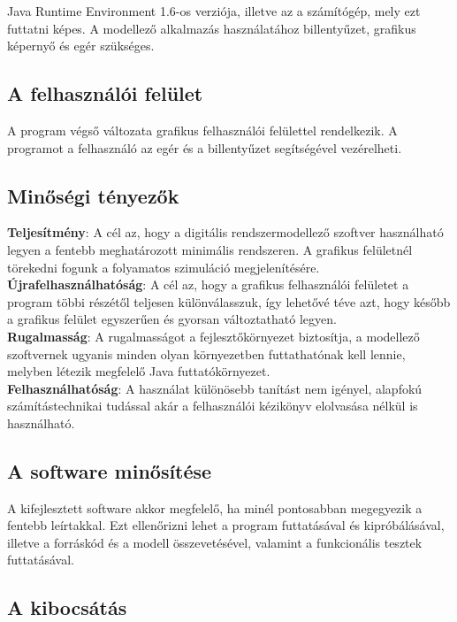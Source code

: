 Java Runtime Environment 1.6-os verziója, illetve az a számítógép, mely ezt futtatni képes. A modellező alkalmazás használatához billentyűzet, grafikus képernyő és egér szükséges.

\subsection{A felhasználói felület}

A program végső változata grafikus felhasználói felülettel rendelkezik. A programot a felhasználó az egér és a billentyűzet segítségével vezérelheti.

\subsection{Minőségi tényezők}

\textbf{Teljesítmény}: A cél az, hogy a digitális rendszermodellező szoftver használható legyen a fentebb meghatározott minimális rendszeren. A grafikus felületnél törekedni fogunk a folyamatos szimuláció megjelenítésére.\\
\textbf{Újrafelhasználhatóság}: A cél az, hogy a grafikus felhasználói felületet a program többi részétől teljesen különválasszuk, így lehetővé téve azt, hogy később a grafikus felület egyszerűen és gyorsan változtatható legyen.\\
\textbf{Rugalmasság}: A rugalmasságot a fejlesztőkörnyezet biztosítja, a modellező szoftvernek ugyanis minden olyan környezetben futtathatónak kell lennie, melyben létezik megfelelő Java futtatókörnyezet.\\
\textbf{Felhasználhatóság}: A használat különösebb tanítást nem igényel, alapfokú számítástechnikai tudással akár a felhasználói kézikönyv elolvasása nélkül is használható.

\subsection{A software minősítése}

A kifejlesztett software akkor megfelelő, ha minél pontosabban megegyezik a fentebb leírtakkal. Ezt ellenőrizni lehet a program futtatásával és kipróbálásával, illetve a forráskód és a modell összevetésével, valamint a funkcionális tesztek futtatásával.

\subsection{A kibocsátás}

